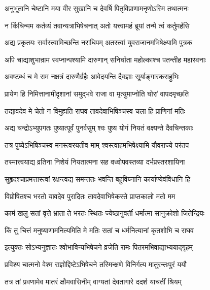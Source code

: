 \twolineshloka
{अनुभूतानि चेष्टानि मया वीर सुखानि च}
{देवर्षि पितृविप्राणामनृणोऽस्मि तथात्मनः} %

\twolineshloka
{न किंचिन्मम कर्तव्यं तवान्यत्राभिषेचनात्}
{अतो यत्त्वामहं ब्रूयां तन्मे त्वं कर्तुमर्हसि} %

\twolineshloka
{अद्य प्रकृतयः सर्वास्त्वामिच्छन्ति नराधिपम्}
{अतस्त्वां युवराजानमभिषेक्ष्यामि पुत्रक} %

\twolineshloka
{अपि चाद्याशुभान्राम स्वप्नान्पश्यामि दारुणान्}
{सनिर्घाता महोल्काश्च पतन्तीह महास्वनाः} %

\twolineshloka
{अवष्टब्धं च मे राम नक्षत्रं दारुणैर्ग्रहैः}
{आवेदयन्ति दैवज्ञाः सूर्याङ्गारकराहुभिः} %

\twolineshloka
{प्रायेण हि निमित्तानामीदृशानां समुद्भवे}
{राजा वा मृत्युमाप्नोति घोरां वापदमृच्छति} %

\twolineshloka
{तद्यावदेव मे चेतो न विमुह्यति राघव}
{तावदेवाभिषिञ्चस्व चला हि प्राणिनां मतिः} %

\twolineshloka
{अद्य चन्द्रोऽभ्युपगतः पुष्यात्पूर्वं पुनर्वसुम्}
{श्वः पुष्य योगं नियतं वक्ष्यन्ते दैवचिन्तकाः} %

\twolineshloka
{तत्र पुष्येऽभिषिञ्चस्व मनस्त्वरयतीव माम्}
{श्वस्त्वाहमभिषेक्ष्यामि यौवराज्ये परंतप} %

\twolineshloka
{तस्मात्त्वयाद्य व्रतिना निशेयं नियतात्मना}
{सह वध्वोपवस्तव्या दर्भप्रस्तरशायिना} %

\twolineshloka
{सुहृदश्चाप्रमत्तास्त्वां रक्षन्त्वद्य समन्ततः}
{भवन्ति बहुविघ्नानि कार्याण्येवंविधानि हि} %

\twolineshloka
{विप्रोषितश्च भरतो यावदेव पुरादितः}
{तावदेवाभिषेकस्ते प्राप्तकालो मतो मम} %

\twolineshloka
{कामं खलु सतां वृत्ते भ्राता ते भरतः स्थितः}
{ज्येष्ठानुवर्ती धर्मात्मा सानुक्रोशो जितेन्द्रियः} %

\twolineshloka
{किं तु चित्तं मनुष्याणामनित्यमिति मे मतिः}
{सतां च धर्मनित्यानां कृतशोभि च राघव} %

\twolineshloka
{इत्युक्तः सोऽभ्यनुज्ञातः श्वोभाविन्यभिषेचने}
{व्रजेति रामः पितरमभिवाद्याभ्ययाद्गृहम्} %

\twolineshloka
{प्रविश्य चात्मनो वेश्म राज्ञोद्दिष्टेऽभिषेचने}
{तस्मिन्क्षणे विनिर्गत्य मातुरन्तःपुरं ययौ} %

\twolineshloka
{तत्र तां प्रवणामेव मातरं क्षौमवासिनीम्}
{वाग्यतां देवतागारे ददर्श याचतीं श्रियम्} %

